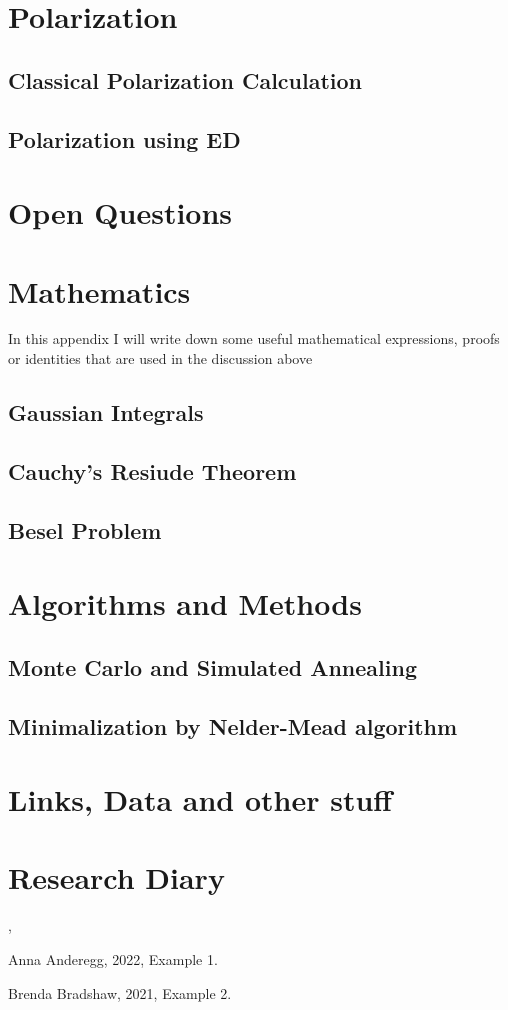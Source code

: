 \section{Polarization}
	\subsection{Classical Polarization Calculation}
	\subsection{Polarization using ED}

\section{Open Questions}
	
\appendix
\section{Mathematics}
	In this appendix I will write down some useful mathematical expressions, proofs or identities that are used in the discussion above
		\subsection{Gaussian Integrals}
		\subsection{Cauchy's Resiude Theorem}\label{CRT}
		\subsection{Besel Problem}
			
		
\section{Algorithms and Methods}
		\subsection{Monte Carlo and Simulated Annealing}
		\subsection{Minimalization by Nelder-Mead algorithm}

\section{Links, Data and other stuff}	

\section{Research Diary}


\cite{aa}, \cite{bb}

\newpage
\begin{thebibliography}{3}

 Anna Anderegg, 2022, Example 1.

 Brenda Bradshaw, 2021, Example 2.

\end{thebibliography}


